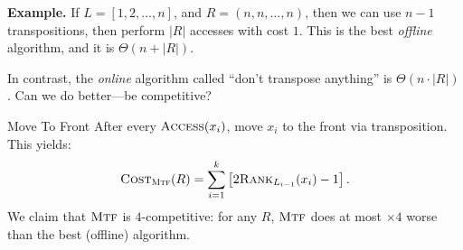 \textbf{Example.} If $L = [1, 2, \dots, n]$, and $R = (n, n, \dots, n)$, then we can use $n - 1$ transpositions,  then perform $|R|$ accesses with cost $1$.  This is the best \emph{offline} algorithm, and it is $\Theta(n + |R|)$.

In contrast, the \emph{online} algorithm called ``don't transpose anything'' is $\Theta(n \cdot |R|)$.  Can we do better---be competitive?

\begin{solution}{Move To Front}
    After every $\textsc{Access}(x_i)$, move $x_i$ to the front via transposition.  This yields:
    \[ \textsc{Cost}_{\textsc{Mtf}}(R) = \sum_{i = 1}^k \left [ 2 \textsc{Rank}_{L_{i - 1}}(x_i) - 1 \right ]. \]
    We claim that $\textsc{Mtf}$ is $4$-competitive: for any $R$, $\textsc{Mtf}$ does at most $\times 4$ worse than the best (offline) algorithm.
\end{solution}

